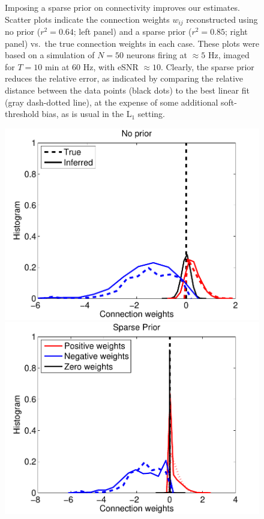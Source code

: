 \documentclass[aoas,preprint]{imsart}
\begin{document}
\begin{figure}[t!]
\begin{minipage}[c]{0.45\hsize}
\end{minipage}
\caption{Imposing a sparse prior on connectivity improves our
estimates.  Scatter plots indicate the connection weights $w_{ij}$
reconstructed using no prior ($r^2=0.64$; left panel) and a sparse
prior ($r^2=0.85$; right panel) vs.~the true connection weights in
each case.  These plots were based on a simulation of $N=50$ neurons
firing at $\approx 5$ Hz, imaged for $T=10$ min at $60$ Hz, with eSNR
$\approx 10$.  Clearly, the sparse prior reduces the relative error,
as indicated by comparing the relative distance between the data
points (black dots) to the best linear fit (gray dash-dotted line), at
the expense of some additional soft-threshold bias, as is usual in the
L$_1$ setting.}
\label{fig:sparse}
\end{figure}

\begin{figure}[t!]
\centering
\begin{minipage}[c]{0.45\hsize}
\includegraphics[width=\hsize]{../figs/FigureA3_hist_glm200}
\end{minipage}
\begin{minipage}[c]{0.45\hsize}
\includegraphics[width=\hsize]{../figs/FigureA3_hist_spa200}

\end{minipage}
\end{figure}
\end{document}
